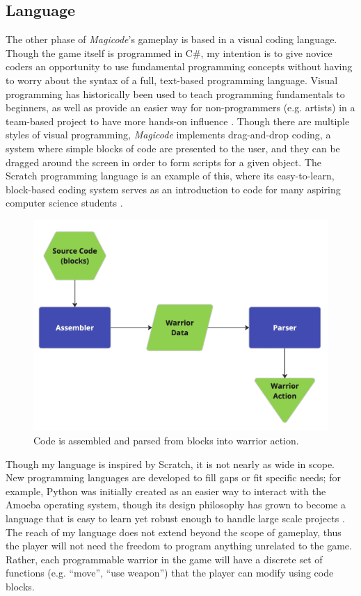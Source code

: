 \documentclass[10pt,twocolumn]{article}
\begin{document}
\subsection{Language}
The other phase of \textit{Magicode}’s gameplay is based in a visual coding language. Though the game itself is programmed in C\#, my intention is to give novice coders an opportunity to use fundamental programming concepts without having to worry about the syntax of a full, text-based programming language. Visual programming has historically been used to teach programming fundamentals to beginners, as well as provide an easier way for non-programmers (e.g. artists) in a team-based project to have more hands-on influence \cite{visual-oop}. Though there are multiple styles of visual programming, \textit{Magicode} implements drag-and-drop coding, a system where simple blocks of code are presented to the user, and they can be dragged around the screen in order to form scripts for a given object. The Scratch programming language is an example of this, where its easy-to-learn, block-based coding system serves as an introduction to code for many aspiring computer science students \cite{scratch-website}.

\begin{figure}
    \includegraphics[width=\linewidth]{images/compiler.jpg}
    \caption{Code is assembled and parsed from blocks into warrior action.}
    \label{fig:compiler-diagram}
\end{figure}


Though my language is inspired by Scratch, it is not nearly as wide in scope. New programming languages are developed to fill gaps or fit specific needs; for example, Python was initially created as an easier way to interact with the Amoeba operating system, though its design philosophy has grown to become a language that is easy to learn yet robust enough to handle large scale projects \cite{why-python}. The reach of my language does not extend beyond the scope of gameplay, thus the player will not need the freedom to program anything unrelated to the game. Rather, each programmable warrior in the game will have a discrete set of functions (e.g. “move”, “use weapon”) that the player can modify using code blocks.
\end{document}
